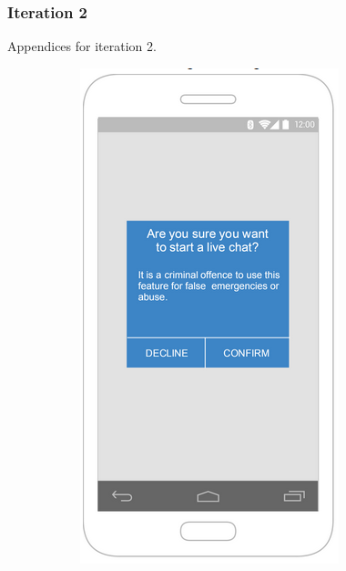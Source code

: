 \documentclass{article}
\begin{document}
    \subsubsection{Iteration 2} Appendices for iteration 2.

	
	\begin{figure}[h]
\centering
\begin{subfigure}{.5\textwidth}
  \centering
  \includegraphics[width=.9\linewidth]{"Chat/7"}
  

\end{subfigure}
\end{figure}
\end{document}
